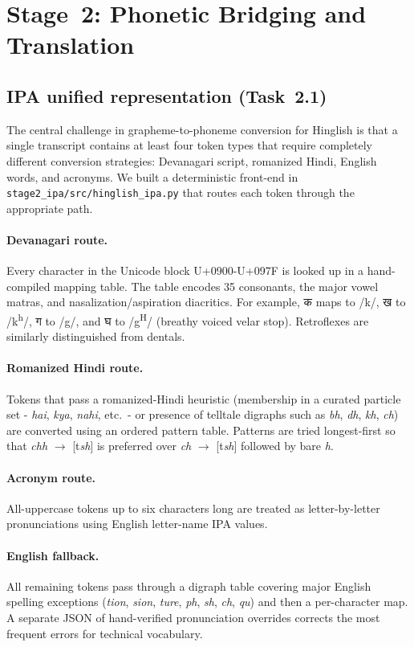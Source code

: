\documentclass[10pt,twocolumn,letterpaper]{article}
\begin{document}
\section{Stage~2: Phonetic Bridging and Translation}
\label{sec:part2}

\subsection{IPA unified representation (Task~2.1)}
\label{sec:ipa}

The central challenge in grapheme-to-phoneme conversion for Hinglish
is that a single transcript contains at least four token types that
require completely different conversion strategies: Devanagari script,
romanized Hindi, English words, and acronyms.  We built a deterministic
front-end in \texttt{stage2\_ipa/src/hinglish\_ipa.py} that routes
each token through the appropriate path.

\paragraph{Devanagari route.}
Every character in the Unicode block U+0900-U+097F is looked up in a
hand-compiled mapping table.  The table encodes 35 consonants, the
major vowel matras, and nasalization/aspiration diacritics.  For
example, क maps to /k/, ख to /k\textsuperscript{h}/,
ग to /g/, and घ to /g\textsuperscript{H}/ (breathy voiced velar
stop).  Retroflexes are similarly distinguished from dentals.

\paragraph{Romanized Hindi route.}
Tokens that pass a romanized-Hindi heuristic (membership in a curated
particle set - \emph{hai}, \emph{kya}, \emph{nahi}, etc.\ - or
presence of telltale digraphs such as \emph{bh}, \emph{dh}, \emph{kh},
\emph{ch}) are converted using an ordered pattern table.  Patterns are
tried longest-first so that \emph{chh} $\to$ [t\textit{sh}] is
preferred over \emph{ch} $\to$ [t\textit{sh}] followed by bare
\emph{h}.

\paragraph{Acronym route.}
All-uppercase tokens up to six characters long are treated as
letter-by-letter pronunciations using English letter-name IPA values.

\paragraph{English fallback.}
All remaining tokens pass through a digraph table covering major
English spelling exceptions (\emph{tion}, \emph{sion}, \emph{ture},
\emph{ph}, \emph{sh}, \emph{ch}, \emph{qu}) and then a per-character
map.  A separate JSON of hand-verified pronunciation overrides
corrects the most frequent errors for technical vocabulary.
\end{document}

